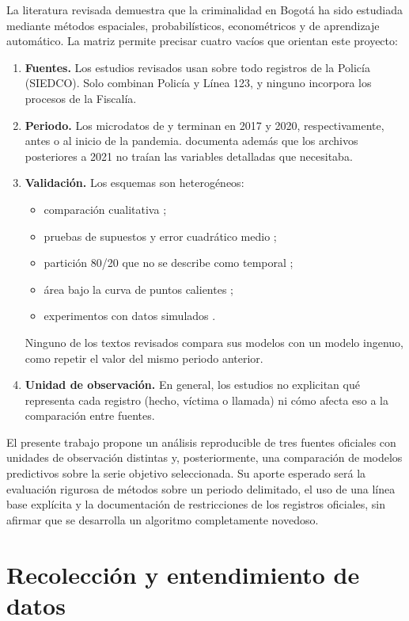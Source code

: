 \documentclass[12pt,letterpaper]{article}
\begin{document}
La literatura revisada demuestra que la criminalidad en Bogotá ha sido estudiada mediante métodos espaciales, probabilísticos, econométricos y de aprendizaje automático. La matriz permite precisar cuatro vacíos que orientan este proyecto:
\begin{enumerate}
  \item \textbf{Fuentes.} Los estudios revisados usan sobre todo registros de la Policía (SIEDCO). Solo \citet{riascos2023} combinan Policía y Línea 123, y ninguno incorpora los procesos de la Fiscalía.
  \item \textbf{Periodo.} Los microdatos de \citet{campo2017} y \citet{martinez2025} terminan en 2017 y 2020, respectivamente, antes o al inicio de la pandemia. \citet{martinez2025} documenta además que los archivos posteriores a 2021 no traían las variables detalladas que necesitaba.
  \item \textbf{Validación.} Los esquemas son heterogéneos:
  \begin{itemize}
    \item comparación cualitativa \citep{campo2017};
    \item pruebas de supuestos y error cuadrático medio \citep{garzon2025};
    \item partición 80/20 que no se describe como temporal \citep{martinez2025};
    \item área bajo la curva de puntos calientes \citep{urcuqui2020};
    \item experimentos con datos simulados \citep{riascos2023}.
  \end{itemize}
  Ninguno de los textos revisados compara sus modelos con un modelo ingenuo, como repetir el valor del mismo periodo anterior.
  \item \textbf{Unidad de observación.} En general, los estudios no explicitan qué representa cada registro (hecho, víctima o llamada) ni cómo afecta eso a la comparación entre fuentes.
\end{enumerate}

El presente trabajo propone un análisis reproducible de tres fuentes oficiales con unidades de observación distintas y, posteriormente, una comparación de modelos predictivos sobre la serie objetivo seleccionada. Su aporte esperado será la evaluación rigurosa de métodos sobre un periodo delimitado, el uso de una línea base explícita y la documentación de restricciones de los registros oficiales, sin afirmar que se desarrolla un algoritmo completamente novedoso.

\section{Recolección y entendimiento de datos}\label{sec:datos}
\end{document}
